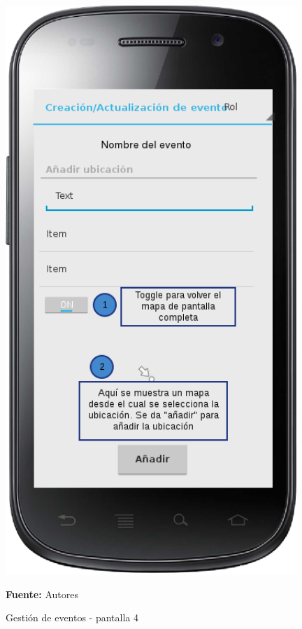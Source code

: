 \begin{figure}[!htb]
  \begin{center}
    \includegraphics[width=11cm]{./imagenes/UI/Eventos/gestion_eventos_4.png}
    \caption{Gestión de eventos - pantalla 4}
    \label{fig:gestion_eventos_4}
    \textbf{Fuente:}  Autores
  \end{center}
\end{figure}


